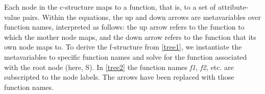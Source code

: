 \documentclass[output=paper
                ,modfonts
                ,nonflat
	        ,collection
	        ,collectionchapter
	        ,collectiontoclongg
 	        ,biblatex
                ,babelshorthands
                ,newtxmath
                ,draftmode
                ,colorlinks, citecolor=brown
]{./langsci/langscibook}
\begin{document}
\ex 

{\label{indent}
\qquad{}

\qquad{}}


\zl




\eal 
 \label{tree1} { }
\zl
{}

\noindent
Each node in the c-structure maps to a function, that is, to a set of attribute-value pairs.  Within the equations, the up and down arrows are metavariables over function names, interpreted as follows:  the up arrow refers to the function to which the mother node maps, and the down arrow refers to the function that its own node maps to.  To derive the f-structure from \ref{tree1}, we instantiate the metavariables to specific function names and solve for the function associated with the root node (here, S).  In \ref{tree2} the function names \textit{f1, f2,} etc. are subscripted to the node labels.  The arrows have been replaced with those function names.  
\end{document}

